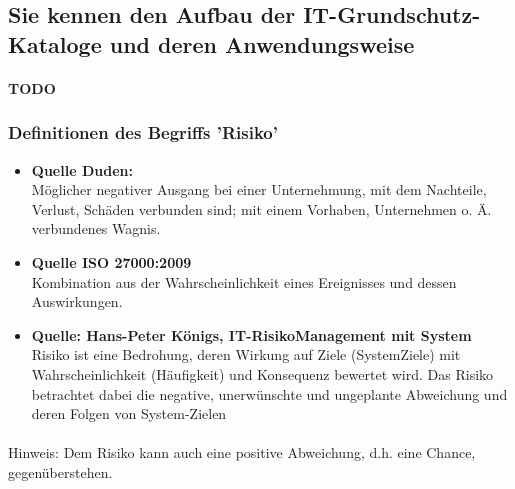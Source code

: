 \documentclass[10pt,a4paper]{article}
\begin{document}
\subsection*{Sie kennen den Aufbau der IT-Grundschutz-Kataloge und deren Anwendungsweise}
\paragraph*{TODO}







\subsubsection*{Definitionen des Begriffs 'Risiko'}
\begin{itemize}[noitemsep,topsep=0pt,leftmargin=*]
    \item \textbf{Quelle Duden:} \\ Möglicher negativer Ausgang bei einer Unternehmung, mit
    dem Nachteile, Verlust, Schäden verbunden sind; mit einem
    Vorhaben, Unternehmen o. Ä. verbundenes Wagnis.
    \item \textbf{Quelle ISO 27000:2009} \\ Kombination aus der Wahrscheinlichkeit eines Ereignisses und
    dessen Auswirkungen.
    \item \textbf{Quelle: Hans-Peter Königs, IT-RisikoManagement mit System} \\Risiko ist eine Bedrohung, deren Wirkung auf Ziele (SystemZiele) mit Wahrscheinlichkeit (Häufigkeit) und Konsequenz
    bewertet wird. Das Risiko betrachtet dabei die negative,
    unerwünschte und ungeplante Abweichung und deren Folgen
    von System-Zielen
\end{itemize}
\paragraph*{}Hinweis: Dem Risiko kann auch eine positive Abweichung, d.h. eine Chance, gegenüberstehen.
\end{document}
